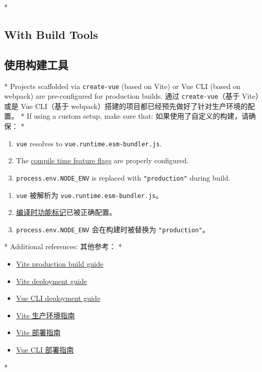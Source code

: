 \begin{paracol}{2} 
 
\switchcolumn[0]*%
\subsection{With Build Tools}
\switchcolumn
\subsection{使用构建工具}
\switchcolumn[0]*%
Projects scaffolded via \texttt{create-vue} (based on Vite) or Vue CLI
(based on webpack) are pre-configured for production builds.
\switchcolumn
通过 \texttt{create-vue}（基于 Vite）或是 Vue CLI（基于
webpack）搭建的项目都已经预先做好了针对生产环境的配置。
\switchcolumn[0]*%
If using a custom setup, make sure that:
\switchcolumn
如果使用了自定义的构建，请确保：
\switchcolumn[0]*%
\begin{enumerate}
\item
  \texttt{vue} resolves to \texttt{vue.runtime.esm-bundler.js}.
\item
  The
  \href{https://github.com/vuejs/core/tree/main/packages/vue\#bundler-build-feature-flags}{compile
  time feature flags} are properly configured.
\item
  \texttt{process.env.NODE\_ENV} is replaced with \texttt{"production"}
  during build.
\end{enumerate}
\switchcolumn
\begin{enumerate}
\item
  \texttt{vue} 被解析为 \texttt{vue.runtime.esm-bundler.js}。
\item
  \href{https://github.com/vuejs/core/tree/main/packages/vue\#bundler-build-feature-flags}{编译时功能标记}已被正确配置。
\item
  \texttt{process.env.NODE\_ENV} 会在构建时被替换为
  \texttt{"production"}。
\end{enumerate}
\switchcolumn[0]*%
Additional references:
\switchcolumn
其他参考：
\switchcolumn[0]*%
\begin{itemize}
\item
  \href{https://vitejs.dev/guide/build.html}{Vite production build
  guide}
\item
  \href{https://vitejs.dev/guide/static-deploy.html}{Vite deployment
  guide}
\item
  \href{https://cli.vuejs.org/guide/deployment.html}{Vue CLI deployment
  guide}
\end{itemize}
\switchcolumn
\begin{itemize}
\item
  \href{https://cn.vitejs.dev/guide/build.html}{Vite 生产环境指南}
\item
  \href{https://cn.vitejs.dev/guide/static-deploy.html}{Vite 部署指南}
\item
  \href{https://cli.vuejs.org/zh/guide/deployment.html}{Vue CLI
  部署指南}
\end{itemize}
\switchcolumn[0]*%

\end{paracol}
